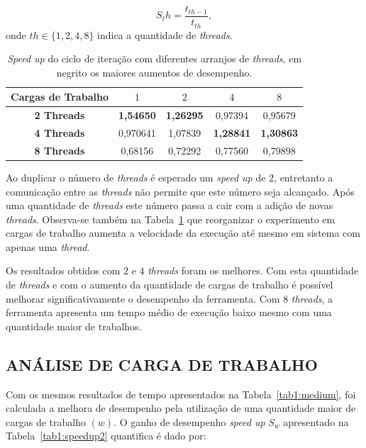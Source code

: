 \begin{equation}
	S_th = \frac{t_{th-1}}{t_{th}},
	\label{eq:speedup1}
\end{equation}
onde $th \in \{1,2,4,8\}$ indica a quantidade de \textit{threads}.

\begin{table}[!htbp]
\caption{\textit{Speed up} do ciclo de iteração com diferentes arranjos de \textit{threads}, em negrito os maiores aumentos de desempenho.}
\centering{}
\begin{tabular}{c|c|c|c|c}
	\toprule 
	\textbf{Cargas de Trabalho}	& $1$ & $2$ & $4$  & $8$\\ 
	\midrule 
	\textbf{2 Threads} & \textbf{1,54650} &	\textbf{1,26295} & 0,97394 &	0,95679\\ 
	\midrule 
	\textbf{4 Threads} & 0,970641 &	1,07839 &	\textbf{1,28841} & \textbf{1,30863}\\ 
	\midrule 
	\textbf{8 Threads} & 0,68156 &	0,72292 & 0,77560 & 0,79898
	\\ 
	\bottomrule 
\end{tabular} 
\label{tab1:speedup}
\end{table}

Ao duplicar o número de \textit{threads} é esperado um \textit{speed up} de $2$, entretanto a comunicação entre as \textit{threads} não permite que este número seja alcançado. Após uma quantidade de \textit{threads} este número passa a cair com a adição de novas \textit{threads}. Observa-se também na Tabela~\ref{tab1:speedup} que reorganizar o experimento em cargas de trabalho aumenta a velocidade da execução até mesmo em sistema com apenas uma \textit{thread}.

Os resultados obtidos com $2$ e $4$ \textit{threads} foram os melhores. Com esta quantidade de \textit{threads} e com o aumento da quantidade de cargas de trabalho é possível melhorar significativamente o desempenho da ferramenta. Com $8$ \textit{threads}, a ferramenta apresenta um tempo médio de execução baixo mesmo com uma quantidade maior de trabalhos.

\subsection{ANÁLISE DE CARGA DE TRABALHO}\label{sec:cenario5}

Com os mesmos resultados de tempo apresentados na Tabela~\ref{tab1:medium}, foi calculada a melhora de desempenho pela utilização de uma quantidade maior de cargas de trabalho $(w)$. O ganho de desempenho \textit{speed up} $S_w$ apresentado na Tabela~\ref{tab1:speedup2} quantifica é dado por:

